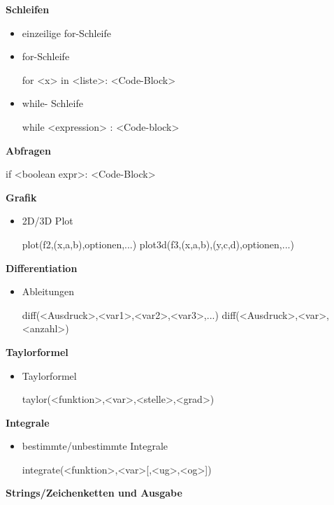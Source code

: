 \documentclass[a4paper,9pt,DIV15,twocolumn]{scrartcl}
\begin{document}
\textbf{Schleifen}
\begin{itemize}
\item einzeilige for-Schleife
    \begin{sagein}
    \end{sagein}
\item for-Schleife
    \begin{sagein}
for <x> in <liste>:
    <Code-Block>
    \end{sagein}
  \item while- Schleife
\begin{sagein}
while <expression> :
    <Code-block>
\end{sagein}
\end{itemize}
\textbf{Abfragen}
\begin{sagein}
if <boolean expr>:
    <Code-Block>
\end{sagein}

\textbf{Grafik}
\begin{itemize}
\item 2D/3D Plot
\begin{sagein}
plot(f2,(x,a,b),optionen,...)
plot3d(f3,(x,a,b),(y,c,d),optionen,...)
\end{sagein}
\end{itemize}

\textbf{Differentiation}
\begin{itemize}
 \item Ableitungen
\begin{sagein}
diff(<Ausdruck>,<var1>,<var2>,<var3>,...)
diff(<Ausdruck>,<var>,<anzahl>) 
\end{sagein}
\end{itemize}

\textbf{Taylorformel}
\begin{itemize}
 \item Taylorformel
\begin{sagein}
taylor(<funktion>,<var>,<stelle>,<grad>)
\end{sagein}
\end{itemize}

\textbf{Integrale}
\begin{itemize}
\item bestimmte/unbestimmte Integrale
\begin{sagein}
integrate(<funktion>,<var>[,<ug>,<og>]) 
\end{sagein}
\end{itemize}

\textbf{Strings/Zeichenketten und Ausgabe}
\end{document}

